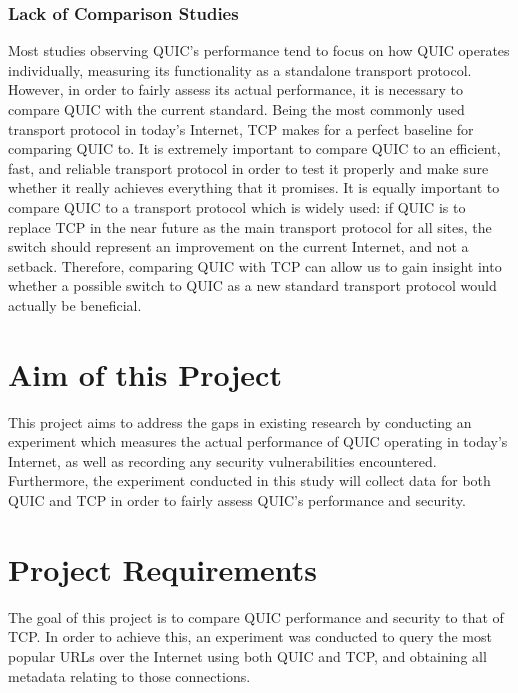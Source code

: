 \documentclass{l4proj}
\begin{document}
\subsubsection{Lack of Comparison Studies} Most studies observing QUIC's performance tend to focus on how QUIC operates individually, measuring its functionality as a standalone transport protocol. However, in order to fairly assess its actual performance, it is necessary to compare QUIC with the current standard. Being the most commonly used transport protocol in today's Internet, TCP makes for a perfect baseline for comparing QUIC to. It is extremely important to compare QUIC to an efficient, fast, and reliable transport protocol in order to test it properly and make sure whether it really achieves everything that it promises. It is equally important to compare QUIC to a transport protocol which is widely used: if QUIC is to replace TCP in the near future as the main transport protocol for all sites, the switch should represent an improvement on the current Internet, and not a setback. Therefore, comparing QUIC with TCP can allow us to gain insight into whether a possible switch to QUIC as a new standard transport protocol would actually be beneficial.

\section{Aim of this Project}

This project aims to address the gaps in existing research by conducting an experiment which measures the actual performance of QUIC operating in today's Internet, as well as recording any security vulnerabilities encountered. Furthermore, the experiment conducted in this study will collect data for both QUIC and TCP in order to fairly assess QUIC's performance and security. 


\section{Project Requirements}

The goal of this project is to compare QUIC performance and security to that of TCP. In order to achieve this, an experiment was conducted to query the most popular URLs over the Internet using both QUIC and TCP, and obtaining all metadata relating to those connections. 
\end{document}
